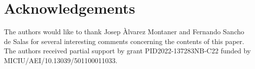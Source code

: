 \documentclass[11pt]{amsart}
\begin{document}
\section*{Acknowledgements}
The authors would like to thank Josep \`Alvarez Montaner and Fernando Sancho de Salas for several interesting comments concerning the contents of this paper. The authors received partial support by grant PID2022-137283NB-C22 funded by  MICIU/AEI/10.13039/501100011033.




\end{document}
